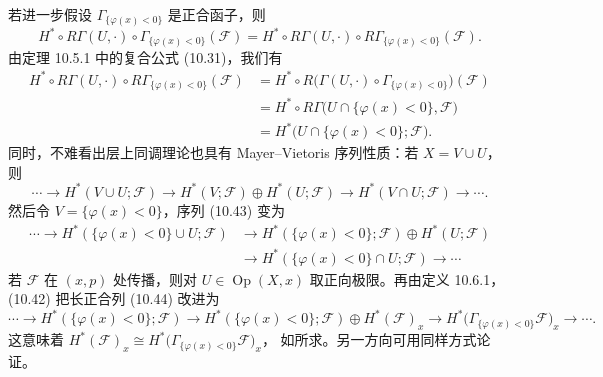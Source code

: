 \begin{wproof}[命题 10.7.1 的证明]
  若进一步假设 $\Gamma_{\{\varphi(x)<0\}}$ 是正合函子，则
  \[
    H^*\circ R\Gamma(U,\cdot)\circ\Gamma_{\{\varphi(x)<0\}}(\mathcal F)
    =H^*\circ R\Gamma(U,\cdot)\circ R\Gamma_{\{\varphi(x)<0\}}(\mathcal F).
  \]
  由定理 10.5.1 中的复合公式 (10.31)，我们有
  \begin{equation}\tag{10.42}
    \begin{aligned}
      H^*\circ R\Gamma(U,\cdot)\circ R\Gamma_{\{\varphi(x)<0\}}(\mathcal F)
      &=H^*\circ R\bigl(\Gamma(U,\cdot)\circ
        \Gamma_{\{\varphi(x)<0\}}\bigr)(\mathcal F)\\
      &=H^*\circ R\Gamma\bigl(U\cap\{\varphi(x)<0\},\mathcal F\bigr)\\
      &=H^*\bigl(U\cap\{\varphi(x)<0\};\mathcal F\bigr).
    \end{aligned}
  \end{equation}
  同时，不难看出层上同调理论也具有 Mayer--Vietoris 序列性质：若 $X=V\cup U$，
  则
  \begin{equation}\tag{10.43}
    \cdots\to H^*(V\cup U;\mathcal F)\to H^*(V;\mathcal F)\oplus H^*(U;\mathcal F)
    \to H^*(V\cap U;\mathcal F)\to\cdots.
  \end{equation}
  然后令 $V=\{\varphi(x)<0\}$，序列 (10.43) 变为
  \begin{equation}\tag{10.44}
    \begin{aligned}
      \cdots\longrightarrow H^*(\{\varphi(x)<0\}\cup U;\mathcal F)
      &\longrightarrow H^*(\{\varphi(x)<0\};\mathcal F)\oplus H^*(U;\mathcal F)\\
      &\longrightarrow H^*(\{\varphi(x)<0\}\cap U;\mathcal F)\longrightarrow\cdots
    \end{aligned}
  \end{equation}
  若 $\mathcal F$ 在 $(x,p)$ 处传播，则对 $U\in\operatorname{Op}(X,x)$ 取正向极限。再由定义
  10.6.1，(10.42) 把长正合列 (10.44) 改进为
  \[
    \cdots\to H^*(\{\varphi(x)<0\};\mathcal F)
    \to H^*(\{\varphi(x)<0\};\mathcal F)\oplus H^*(\mathcal F)_x
    \to H^*\bigl(\Gamma_{\{\varphi(x)<0\}}\mathcal F\bigr)_x\to\cdots.
  \]
  这意味着
  $H^*(\mathcal F)_x\cong H^*\bigl(\Gamma_{\{\varphi(x)<0\}}\mathcal F\bigr)_x$，
  如所求。另一方向可用同样方式论证。
\end{wproof}


